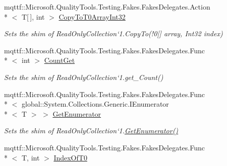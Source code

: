 \begin{DoxyCompactItemize}
mqttf\-::\-Microsoft.\-Quality\-Tools.\-Testing.\-Fakes.\-Fakes\-Delegates.\-Action\\*
$<$ T\mbox{[}$\,$\mbox{]}, int $>$ \hyperlink{class_system_1_1_collections_1_1_object_model_1_1_fakes_1_1_shim_read_only_collection_3_01_t_01_4_ac3f1cab7bdd86dcdcc2c9ef3f554c45e}{Copy\-To\-T0\-Array\-Int32}
\begin{DoxyCompactList}\small\item\em Sets the shim of Read\-Only\-Collection`1.Copy\-To(!0\mbox{[}\mbox{]} array, Int32 index)\end{DoxyCompactList}\item 
mqttf\-::\-Microsoft.\-Quality\-Tools.\-Testing.\-Fakes.\-Fakes\-Delegates.\-Func\\*
$<$ int $>$ \hyperlink{class_system_1_1_collections_1_1_object_model_1_1_fakes_1_1_shim_read_only_collection_3_01_t_01_4_a4c8fa25ebcdb007aa4b785dfae732045}{Count\-Get}
\begin{DoxyCompactList}\small\item\em Sets the shim of Read\-Only\-Collection`1.get\-\_\-\-Count()\end{DoxyCompactList}\item 
mqttf\-::\-Microsoft.\-Quality\-Tools.\-Testing.\-Fakes.\-Fakes\-Delegates.\-Func\\*
$<$ global\-::\-System.\-Collections.\-Generic.\-I\-Enumerator\\*
$<$ T $>$ $>$ \hyperlink{class_system_1_1_collections_1_1_object_model_1_1_fakes_1_1_shim_read_only_collection_3_01_t_01_4_a2947a3d4ce1a04c4c8a9086007ed147a}{Get\-Enumerator}
\begin{DoxyCompactList}\small\item\em Sets the shim of Read\-Only\-Collection`1.\hyperlink{class_system_1_1_collections_1_1_object_model_1_1_fakes_1_1_shim_read_only_collection_3_01_t_01_4_a2947a3d4ce1a04c4c8a9086007ed147a}{Get\-Enumerator()}\end{DoxyCompactList}\item 
mqttf\-::\-Microsoft.\-Quality\-Tools.\-Testing.\-Fakes.\-Fakes\-Delegates.\-Func\\*
$<$ T, int $>$ \hyperlink{class_system_1_1_collections_1_1_object_model_1_1_fakes_1_1_shim_read_only_collection_3_01_t_01_4_a8c9862452b4105a1daa2db91a6c15989}{Index\-Of\-T0}

\end{DoxyCompactItemize}
